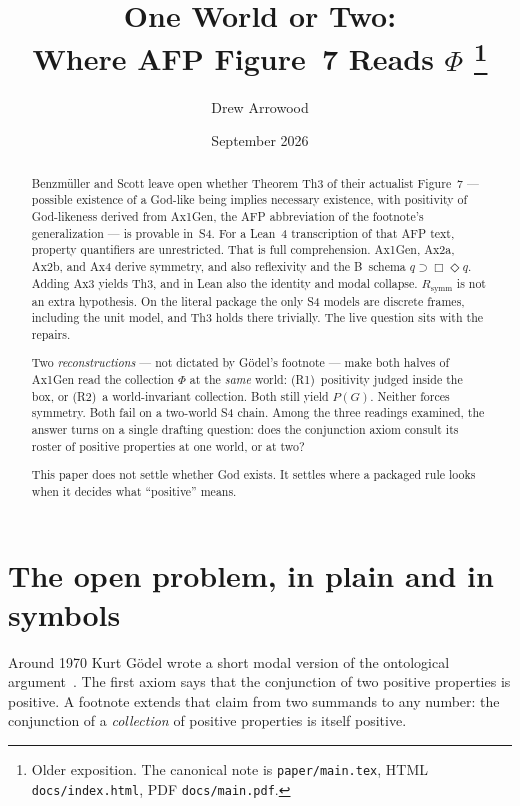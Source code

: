 \documentclass[11pt]{article}
\title{One World or Two:\\
Where AFP Figure~7 Reads $\Phi$%
\thanks{Older exposition. The canonical note is \texttt{paper/main.tex},
HTML \texttt{docs/index.html}, PDF \texttt{docs/main.pdf}.}}
\author{Drew Arrowood}
\date{September 2026}
\begin{document}
\maketitle

\begin{abstract}
Benzm\"uller and Scott leave open whether Theorem Th3 of their actualist Figure~7 ---
possible existence of a God-like being implies necessary existence, with positivity of
God-likeness derived from Ax1Gen, the AFP abbreviation of the footnote's
generalization --- is provable in~S4.
For a Lean~4 transcription of that AFP text, property quantifiers are unrestricted.
That is full comprehension.
Ax1Gen, Ax2a, Ax2b, and Ax4 derive symmetry, and also reflexivity and the B~schema
\(q \supset \Box\Diamond q\). Adding Ax3 yields Th3, and in Lean also the identity and
modal collapse. \(R_{\mathrm{symm}}\) is not an extra hypothesis. On the literal package
the only S4 models are discrete frames, including the unit model, and Th3 holds there
trivially. The live question sits with the repairs.

Two \emph{reconstructions} --- not dictated by G\"odel's footnote --- make both halves of
Ax1Gen read the collection \(\Phi\) at the \emph{same} world: (R1)~positivity judged inside
the box, or (R2)~a world-invariant collection. Both still yield \(P(G)\). Neither forces
symmetry. Both fail on a two-world S4 chain. Among the three readings examined, the answer
turns on a single drafting question: does the conjunction axiom consult its roster of
positive properties at one world, or at two?

This paper does not settle whether God exists. It settles where a packaged rule looks when
it decides what ``positive'' means.
\end{abstract}

\section{The open problem, in plain and in symbols}

Around 1970 Kurt G\"odel wrote a short modal version of the ontological argument~\cite{Godel1995}.
The first axiom says that the conjunction of two positive properties is positive. A footnote
extends that claim from two summands to any number: the conjunction of a \emph{collection}
of positive properties is itself positive.
\end{document}
